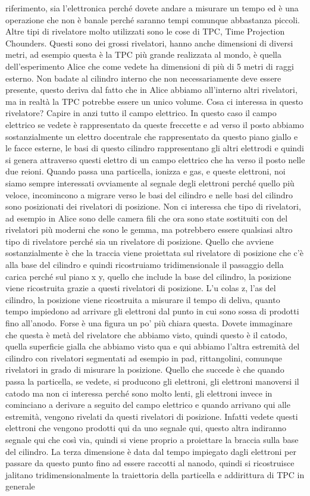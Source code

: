 {riferimento, sia l'elettronica perché dovete andare a misurare un tempo ed è una operazione che non è banale perché saranno tempi comunque abbastanza piccoli. Altre tipi di rivelatore molto utilizzati sono le cose di TPC, Time Projection Chounders. Questi sono dei grossi rivelatori, hanno anche dimensioni di diversi metri, ad esempio questa è la TPC più grande realizzata al mondo, è quella dell'esperimento Alice che come vedete ha dimensioni di più di 5 metri di raggi esterno. Non badate al cilindro interno che non necessariamente deve essere presente, questo deriva dal fatto che in Alice abbiamo all'interno altri rivelatori, ma in realtà la TPC potrebbe essere un unico volume. Cosa ci interessa in questo rivelatore? Capire in anzi tutto il campo elettrico. In questo caso il campo elettrico se vedete è rappresentato da queste freccette e ad verso il posto abbiamo sostanzialmente un elettro docentrale che rappresentato da questo piano giallo e le facce esterne, le basi di questo cilindro rappresentano gli altri elettrodi e quindi si genera attraverso questi elettro di un campo elettrico che ha verso il posto nelle due reioni. Quando passa una particella, ionizza e gas, e queste elettroni, noi siamo sempre interessati ovviamente al segnale degli elettroni perché quello più veloce, incomincono a migrare verso le basi del cilindro e nelle basi del cilindro sono posizionati dei rivelatori di posizione. Non ci interessa che tipo di rivelatori, ad esempio in Alice sono delle camera fili che ora sono state sostituiti con del rivelatori più moderni che sono le gemma, ma potrebbero essere qualsiasi altro tipo di rivelatore perché sia un rivelatore di posizione. Quello che avviene sostanzialmente è che la traccia viene proiettata sul rivelatore di posizione che c'è alla base del cilindro e quindi ricostruiamo tridimensionale il passaggio della carica perché sul piano x y, quello che include la base del cilindro, la posizione viene ricostruita grazie a questi rivelatori di posizione. L'u colas z, l'as del cilindro, la posizione viene ricostruita a misurare il tempo di deliva, quanto tempo impiedono ad arrivare gli elettroni dal punto in cui sono sossa di prodotti fino all'anodo. Forse è una figura un po' più chiara questa. Dovete immaginare che questa è metà del rivelatore che abbiamo visto, quindi questo è il catodo, quella superficie gialla che abbiamo visto qua e qui abbiamo l'altra estremità del cilindro con rivelatori segmentati ad esempio in pad, rittangolini, comunque rivelatori in grado di misurare la posizione. Quello che succede è che quando passa la particella, se vedete, si producono gli elettroni, gli elettroni manoversi il catodo ma non ci interessa perché sono molto lenti, gli elettroni invece in cominciano a derivare a seguito del campo elettrico e quando arrivano qui alle estremità, vengono rivelati da questi rivelatori di posizione. Infatti vedete questi elettroni che vengono prodotti qui da uno segnale qui, questo altra indiranno segnale qui che così via, quindi si viene proprio a proiettare la braccia sulla base del cilindro. La terza dimensione è data dal tempo impiegato dagli elettroni per passare da questo punto fino ad essere raccotti al nanodo, quindi si ricostruisce jalitano tridimensionalmente la traiettoria della particella e addirittura di TPC in generale }
